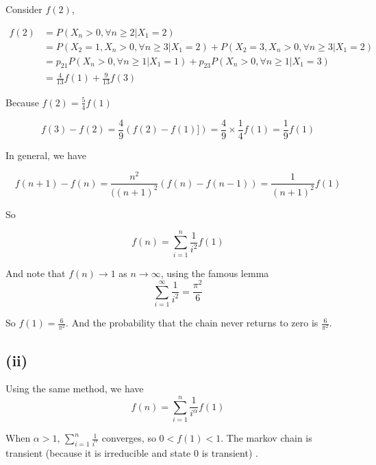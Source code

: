 \documentclass{article}
\begin{document}
Consider $f(2)$,

\begin{equation}
    \begin{aligned}
        f(2) &= P(X_n >0, \forall n\geqslant 2 | X_1 = 2) \\ & = P(X_2 =1, X_n >0,\forall n\geqslant 3 | X_1= 2)  + P(X_2 =3, X_n >0,\forall n\geqslant 3 | X_1 = 2) \\
        & = p_{21} P(X_n >0, \forall n\geqslant1 | X_1 = 1) + p_{23} P(X_n >0, \forall n\geqslant1 | X_1 = 3) \\
        & = \frac{4}{13} f(1) + \frac{9}{13} f(3)
    \end{aligned}
\end{equation}

Because $f(2) = \frac{5}{4} f(1)$

\begin{equation}
    f(3) - f(2) = \frac{4}{9} (f(2)-f(1)])  = \frac{4}{9} \times \frac{1}{4} f(1) = \frac{1}{9} f(1)
\end{equation}

In general, we have

\begin{equation}
    f(n+1) - f(n) = \frac{n^2}{((n+1)^2} (f(n) -f (n-1)) = \frac{1}{(n+1)^2} f(1)
\end{equation}

So 

\begin{equation}
    f(n) = \sum_{i=1}^n \frac{1}{i^2} f(1)
\end{equation}

And note that $f(n) \to 1$ as $n \to \infty$, using the famous lemma \begin{equation}
    \sum_{i=1}^{\infty}  \frac{1}{i^2} = \frac{\pi^2}{6}
\end{equation}

So $f(1)= \frac{6}{\pi^2}$. And the probability that the chain never returns to zero is $\frac{6}{\pi^2}$.


\subsection{(ii)}

Using the same method, we have 
\begin{equation}
    f(n) = \sum_{i=1}^n \frac{1}{i^\alpha} f(1)
\end{equation}

When $\alpha> 1$, $\sum_{i=1}^n \frac{1}{i^\alpha}$ converges, so $0<f(1)<1$. The markov chain is transient (because it is irreducible and state $0$ is transient) .
\end{document}
